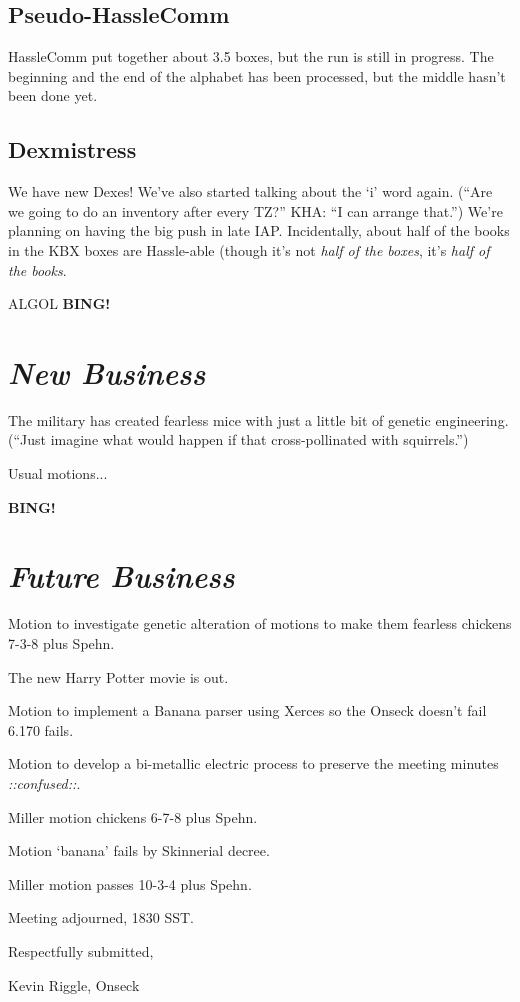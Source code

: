 \documentclass[10pt]{article}
\newcommand{\bing}{{\bf BING!} }
\newcommand{\goto}[1]{\bing \vskip 12pt \section*{{\em{#1}}}}
\newcommand{\ps}{ plus Spehn\xspace}
\begin{document}
\subsection*{Pseudo-HassleComm}
HassleComm put together about 3.5 boxes, but the run is still in progress.  The beginning and the
end of the alphabet has been processed, but the middle hasn't been done yet.

\subsection*{Dexmistress}
We have new Dexes!  We've also started talking about the `i' word again.  (``Are we going to do
an inventory after every TZ?''  KHA: ``I can arrange that.'')  We're planning on having the big push in
late IAP.  Incidentally, about half of the books in the KBX boxes are Hassle-able (though it's not
{\em half of the boxes}, it's {\em half of the books}.

ALGOL
\goto{New Business}

The military has created fearless mice with just a little bit of genetic engineering.  (``Just 
imagine what would happen if that cross-pollinated with squirrels.'')

Usual motions...

\goto{Future Business}
Motion to investigate genetic alteration of motions to make them fearless chickens 7-3-8\ps.

The new Harry Potter movie is out.

Motion to implement a Banana parser using Xerces so the Onseck doesn't fail 6.170 fails.

Motion to develop a bi-metallic electric process to preserve the meeting minutes {\em ::confused::}.

Miller motion chickens 6-7-8\ps.

Motion `banana' fails by Skinnerial decree.

Miller motion passes 10-3-4\ps.

\vspace{12pt}

\noindent
Meeting adjourned, 1830 SST.

\vspace{18pt}

\centerline{Respectfully submitted,}
\centerline{Kevin Riggle, Onseck}
\end{document}
